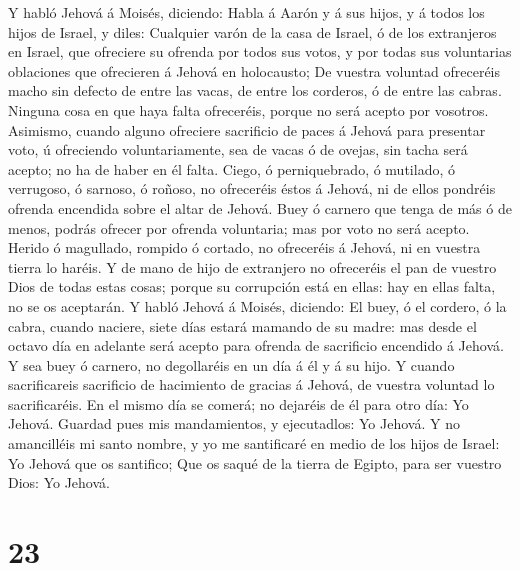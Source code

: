  Y habló Jehová á Moisés, diciendo:  Habla
á Aarón y á sus hijos, y á todos los hijos de Israel, y diles: Cualquier
varón de la casa de Israel, ó de los extranjeros en Israel, que
ofreciere su ofrenda por todos sus votos, y por todas sus voluntarias
oblaciones que ofrecieren á Jehová en holocausto;  De
vuestra voluntad ofreceréis macho sin defecto de entre las vacas, de
entre los corderos, ó de entre las cabras.  Ninguna cosa
en que haya falta ofreceréis, porque no será acepto por vosotros.
 Asimismo, cuando alguno ofreciere sacrificio de paces á
Jehová para presentar voto, ú ofreciendo voluntariamente, sea de vacas ó
de ovejas, sin tacha será acepto; no ha de haber en él falta.
 Ciego, ó perniquebrado, ó mutilado, ó verrugoso, ó
sarnoso, ó roñoso, no ofreceréis éstos á Jehová, ni de ellos pondréis
ofrenda encendida sobre el altar de Jehová.  Buey ó
carnero que tenga de más ó de menos, podrás ofrecer por ofrenda
voluntaria; mas por voto no será acepto.  Herido ó
magullado, rompido ó cortado, no ofreceréis á Jehová, ni en vuestra
tierra lo haréis.  Y de mano de hijo de extranjero no
ofreceréis el pan de vuestro Dios de todas estas cosas; porque su
corrupción está en ellas: hay en ellas falta, no se os aceptarán.
 Y habló Jehová á Moisés, diciendo:  El
buey, ó el cordero, ó la cabra, cuando naciere, siete días estará
mamando de su madre: mas desde el octavo día en adelante será acepto
para ofrenda de sacrificio encendido á Jehová.  Y sea
buey ó carnero, no degollaréis en un día á él y á su hijo.
 Y cuando sacrificareis sacrificio de hacimiento de
gracias á Jehová, de vuestra voluntad lo sacrificaréis. 
En el mismo día se comerá; no dejaréis de él para otro día: Yo Jehová.
 Guardad pues mis mandamientos, y ejecutadlos: Yo Jehová.
 Y no amancilléis mi santo nombre, y yo me santificaré en
medio de los hijos de Israel: Yo Jehová que os santifico;
 Que os saqué de la tierra de Egipto, para ser vuestro
Dios: Yo Jehová.

\hypertarget{section-22}{%
\section{23}\label{section-22}}


